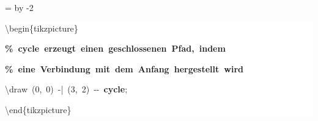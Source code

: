 \begingroup
\ttfamily
{}
=\textwidth
\advance{} by -2\fboxsep
\noindent
\colorbox{background}
{%
\parbox{\dimen255}
{%
\rule[-0.5ex]{0pt}{2.5ex}\hspace*{0.0em}\textbackslash{}begin\{tikzpicture\}\\
\rule[-0.5ex]{0pt}{2.5ex}\hspace*{1.0em}\textcolor{G}{\textbf{\%~cycle~erzeugt~einen~geschlossenen~Pfad,~indem}}\\
\rule[-0.5ex]{0pt}{2.5ex}\hspace*{1.0em}\textcolor{G}{\textbf{\%~eine~Verbindung~mit~dem~Anfang~hergestellt~wird}}\\
\rule[-0.5ex]{0pt}{2.5ex}\hspace*{1.0em}\textbackslash{}draw~(0,~0)~{-}|~(3,~2)~{-}{-}~\textcolor{R}{\textbf{cycle}};\\
\rule[-0.5ex]{0pt}{2.5ex}\hspace*{0.0em}\textbackslash{}end\{tikzpicture\}}%
}%
\endgroup
